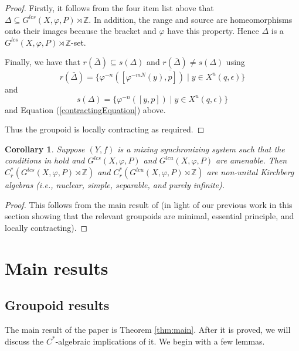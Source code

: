 \documentclass{amsart}
\newcommand{\Z}{{\mathbb Z}}
\theoremstyle{plain}
\newtheorem{corollary}[theorem]{Corollary}
\theoremstyle{definition}
\theoremstyle{remark}
\begin{document}
\begin{proof}
Firstly, it follows from the four item list above that $\Delta \subseteq G^{lcs}(X, \varphi, P)\rtimes \Z$. In addition, the range and source are homeomorphisms onto their images because the bracket and $\varphi$ have this property. Hence $\Delta$ is a $G^{lcs}(X, \varphi, P)\rtimes \Z$-set.

Finally, we have that $r(\bar{\Delta}) \subseteq s(\Delta)$ and $r(\bar{\Delta}) \neq s(\Delta)$ using  
\[
r(\bar{\Delta})= \overline{\{ \varphi^{-n}([\varphi^{-mN}(y), p]) \mid y \in  X^u(q, \epsilon)  \}}
\]
and 
\[
s(\Delta)=\{ \varphi^{-n}([y, p])  \mid y \in X^u(q, \epsilon) \}
\]
and Equation (\ref{contractingEquation}) above. 

Thus the groupoid is locally contracting as required.
\end{proof}

\begin{corollary}
Suppose $(Y, f)$ is a mixing synchronizing system such that the conditions in \cite[Lemma 4.19]{DeeSto} hold and $G^{lcs}(X, \varphi, P)$ and $G^{lcu}(X, \varphi, P)$ are amenable. Then $C^*_r(G^{lcs}(X, \varphi, P) \rtimes \Z)$ and $C^*_r(G^{lcu}(X, \varphi, P) \rtimes \Z)$ are non-unital Kirchberg algebras (i.e., nuclear, simple, separable, and purely infinite).
\end{corollary}
\begin{proof}
This follows from the main result of \cite{AnaDel} (in light of our previous work in this section showing that the relevant groupoids are minimal, essential principle, and locally contracting).
\end{proof}

\section{Main results} \label{sec:Main}

\subsection{Groupoid results}

The main result of the paper is Theorem \ref{thm:main}. After it is proved, we will discuss the $C^\ast$-algebraic implications of it. We begin with a few lemmas.
\end{document}
